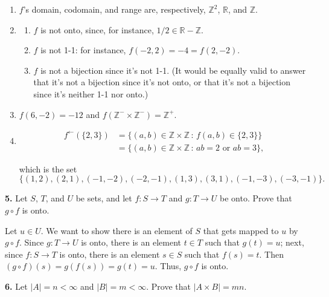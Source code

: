 \documentclass[10pt,]{book}
\theoremstyle{plain}
\theoremstyle{definition}
\theoremstyle{definition}
\theoremstyle{definition}
\theoremstyle{definition}
\numberwithin{equation}{section}
\def\Z{\mathbb{Z}}
\def\R{\mathbb{R}}
\newcommand{\lt}{ < }
\newcommand{\amp}{ & }
\begin{document}
\begin{enumerate}[label=(\alph*)]
\item\hypertarget{li-46}{}
        \(f\)'s domain, codomain, and range are, respectively, \(\Z^2\), \(\R\), and \(\Z\).
\item\hypertarget{li-47}{}%
\begin{enumerate}[label=\roman*.]
\item\hypertarget{li-48}{}
            \(f\) is not onto, since, for instance, \(1/2\in \R-\Z\).
\item\hypertarget{li-49}{}
            \(f\) is not 1-1: for instance, \(f(-2,2)=-4=f(2,-2)\).
\item\hypertarget{li-50}{}
            \(f\) is not a bijection since it's not 1-1. (It would be equally valid to answer that it's not a bijection since it's not onto, or that it's not a bijection since it's neither 1-1 nor onto.)
\end{enumerate}
%
\item\hypertarget{li-51}{}
        \(f(6,-2)=-12\) and \(f(\Z^-\times \Z^-)=\Z^+\).
\item\hypertarget{li-52}{}
\begin{align*}
f^{\leftarrow}(\{2,3\})\amp =\{(a,b)\in \Z\times \Z\,:\, f(a,b)\in \{2,3\}\}\\
\amp =\{(a,b)\in \Z\times \Z\,:\, ab=2 \mbox{ or }  ab=3\},
\end{align*}

        which is the set
\begin{equation*}
\{(1,2),(2,1),(-1,-2),(-2,-1),(1,3),(3,1),(-1,-3),(-3,-1)\}.
\end{equation*}

\end{enumerate}
\par\smallskip
\noindent\textbf{5.}\quad{}
        Let \(S\), \(T\), and \(U\) be sets, and let \(f: S\to T\) and \(g: T\to U\) be onto. Prove that \(g \circ f\) is onto.
\par\smallskip

      Let \(u\in U\). We want to show there is an element of \(S\) that gets mapped to \(u\) by \(g\circ f\). Since \(g:T\to U\) is onto, there is an element \(t\in T\) such that \(g(t)=u\); next, since \(f:S\to T\) is onto, there is an element \(s\in S\) such that \(f(s)=t\). Then \((g\circ f)(s)=g(f(s))=g(t)=u\). Thus, \(g\circ f\) is onto.
\par\smallskip
\noindent\textbf{6.}\quad{}
        Let \(|A|=n\lt \infty\) and \(|B|=m\lt  \infty\). Prove that \(|A\times B|=mn\).
\par\smallskip
\end{document}

